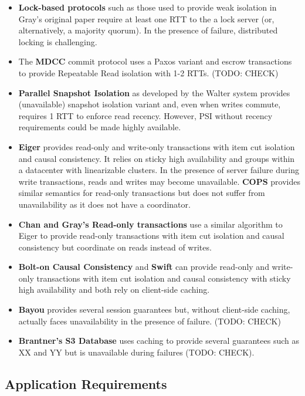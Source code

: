 \begin{itemize}
\item \textbf{Lock-based protocols} such as those used to provide weak
  isolation in Gray's original paper require at least one RTT to the a
  lock server (or, alternatively, a majority quorum). In the presence
  of failure, distributed locking is challenging.
\item The \textbf{MDCC} commit protocol uses a Paxos variant and escrow
  transactions to provide Repeatable Read isolation with 1-2 RTTs. (TODO: CHECK)
\item \textbf{Parallel Snapshot Isolation} as developed by the Walter
  system provides (unavailable) snapshot isolation variant and, even
  when writes commute, requires 1 RTT to enforce read
  recency. However, PSI without recency requirements could be made
  highly available.
\item \textbf{Eiger} provides read-only and write-only transactions
  with item cut isolation and causal consistency. It relies on sticky
  high availability and groups within a datacenter with linearizable
  clusters. In the presence of server failure during write
  transactions, reads and writes may become unavailable. \textbf{COPS}
  provides similar semantics for read-only transactions but does not
  suffer from unavailability as it does not have a coordinator.
\item \textbf{Chan and Gray's Read-only transactions} use a similar
  algorithm to Eiger to provide read-only transactions with item cut
  isolation and causal consistency but coordinate on reads instead of
  writes.
\item \textbf{Bolt-on Causal Consistency} and \textbf{Swift} can
  provide read-only and write-only transactions with item cut
  isolation and causal consistency with sticky high availability and
  both rely on client-side caching.
\item \textbf{Bayou} provides several session guarantees but, without
  client-side caching, actually faces unavailability in the presence
  of failure. (TODO: CHECK)
\item \textbf{Brantner's S3 Database} uses caching to provide several
  guarantees such as XX and YY but is unavailable during failures
  (TODO: CHECK).
\end{itemize}

\subsection{Application Requirements}

